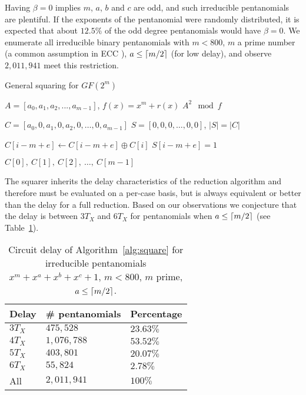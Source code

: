 Having $\beta=0$ implies $m$, $a$, $b$ and $c$ are odd, and such irreducible pentanomials are plentiful. If the exponents of the pentanomial were randomly distributed, it is expected that about $12.5\%$ of the odd degree pentanomials would have $\beta=0$. We enumerate all irreducible binary pentanomials with $m < 800$, $m$ a prime number (a common assumption in ECC \cite{doche2005redundant}), $a \leq \lceil m/2\rceil$ (for low delay), and observe $2,011,941$ meet this restriction.

\begin{algorithm}
\caption{General squaring for $GF(2^m)$}
\label{alg:square}
\begin{algorithmic}[1]
\REQUIRE $A = [a_0, a_1, a_2, ..., a_{m-1}]$, $f(x) = x^m + r(x)$
\ENSURE $A^2 \mod f$

\STATE $C = [a_0, 0, a_1, 0, a_2, 0, \ldots, 0, a_{m-1}]$ 
\STATE $S = [0, 0, 0, \ldots, 0, 0]$, $|S| = |C|$

         
    \ELSE
                 
            \ELSE
                \STATE $C[i-m+e] \leftarrow C[i-m+e] \oplus C[i]$ 
            \ENDIF
            \STATE $S[i-m+e] = 1$
        \ENDFOR
    \ENDIF
\ENDFOR

\RETURN $C[0],~C[1],~C[2],~\ldots,~C[m-1]$
\end{algorithmic}
\end{algorithm}

The squarer inherits the delay characteristics of the reduction algorithm and therefore must be evaluated on a per-case basis, but is always equivalent or better than the delay for a full reduction. Based on our observations we conjecture that the delay is between $3 T_X$ and $6 T_X$ for pentanomials when $a \leq \lceil m/2\rceil$ (see Table~\ref{table:square:delays}).

\begin{table}
\centering
\caption{Circuit delay of Algorithm~\ref{alg:square} for irreducible pentanomials $x^m + x^a + x^b + x^c + 1$, $m < 800$, $m$ prime, $a \leq \lceil m/2\rceil$.}
{\begin{tabular}{l l l} \label{table:square:delays}
Delay & \# pentanomials & Percentage \\ \hline
$3 T_X$ & $475,528$ & $23.63\%$ \\ \hline
$4 T_X$ & $1,076,788$ & $53.52\%$ \\ \hline
$5 T_X$ & $403,801$ & $20.07\%$ \\ \hline 
$6 T_X$ & $55,824$ & $2.78\%$ \\ \hline
All & $2,011,941$ & $100\%$
\end{tabular}}{}
\end{table}

